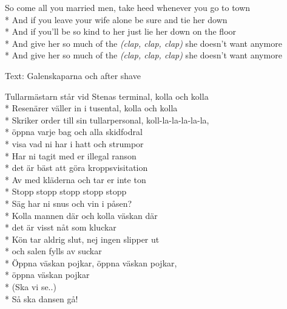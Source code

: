 \begin{SongText}
\begin{SongVerse}
    \end{SongVerse}
    \begin{SongVerse}
        So come all you married men, take heed whenever you go to town\\*%
        And if you leave your wife alone be sure and tie her down\\*%
        And if you'll be so kind to her just lie her down on the floor\\*%
        And give her so much of the \emph{(clap, clap, clap)} she doesn't want anymore\\*%
        And give her so much of the \emph{(clap, clap, clap)} she doesn't want anymore
    \end{SongVerse}
\end{SongText}
\begin{SongText}[Tullarmästarn]
    \begin{SongInfo}
        Text: Galenskaparna och after shave
    \end{SongInfo}
    \begin{SongVerse}
        Tullarmästarn står vid Stenas terminal, kolla och kolla\\*%
        Resenärer väller in i tusental, kolla och kolla\\*%
        Skriker order till sin tullarpersonal, koll-la-la-la-la-la,\\*%
        öppna varje bag och alla skidfodral\\*%
        visa vad ni har i hatt och strumpor\\*%
        Har ni tagit med er illegal ranson\\*%
        det är bäst att göra kroppsvisitation\\*%
        Av med kläderna och tar er inte ton\\*%
        Stopp stopp stopp stopp stopp\\*%
        Säg har ni snus och vin i påsen?\\*%
        Kolla mannen där och kolla väskan där\\*%
        det är visst nåt som kluckar\\*%
        Kön tar aldrig slut, nej ingen slipper ut\\*%
        och salen fylls av suckar\\*%
        Öppna väskan pojkar, öppna väskan pojkar,\\*%
        öppna väskan pojkar\\*%
        (Ska vi se..)\\*%
        Så ska dansen gå!

\end{SongVerse}
\end{SongText}
